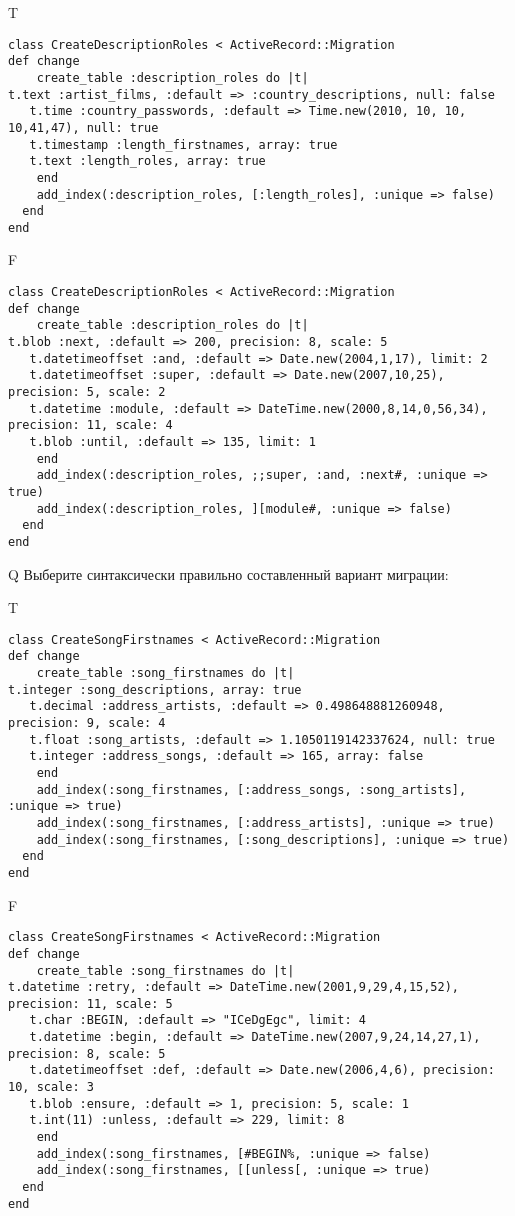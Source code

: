T
\begin{verbatim}
class CreateDescriptionRoles < ActiveRecord::Migration
def change
	create_table :description_roles do |t|
t.text :artist_films, :default => :country_descriptions, null: false
   t.time :country_passwords, :default => Time.new(2010, 10, 10, 10,41,47), null: true
   t.timestamp :length_firstnames, array: true
   t.text :length_roles, array: true
   	end
	add_index(:description_roles, [:length_roles], :unique => false)
  end 
end

\end{verbatim}

F
\begin{verbatim}
class CreateDescriptionRoles < ActiveRecord::Migration
def change
	create_table :description_roles do |t|
t.blob :next, :default => 200, precision: 8, scale: 5
   t.datetimeoffset :and, :default => Date.new(2004,1,17), limit: 2
   t.datetimeoffset :super, :default => Date.new(2007,10,25), precision: 5, scale: 2
   t.datetime :module, :default => DateTime.new(2000,8,14,0,56,34), precision: 11, scale: 4
   t.blob :until, :default => 135, limit: 1
   	end
	add_index(:description_roles, ;;super, :and, :next#, :unique => true)
 	add_index(:description_roles, ][module#, :unique => false)
  end 
end

\end{verbatim}

Q
Выберите синтаксически правильно составленный вариант миграции:

T
\begin{verbatim}
class CreateSongFirstnames < ActiveRecord::Migration
def change
	create_table :song_firstnames do |t|
t.integer :song_descriptions, array: true
   t.decimal :address_artists, :default => 0.498648881260948, precision: 9, scale: 4
   t.float :song_artists, :default => 1.1050119142337624, null: true
   t.integer :address_songs, :default => 165, array: false
   	end
	add_index(:song_firstnames, [:address_songs, :song_artists], :unique => true)
 	add_index(:song_firstnames, [:address_artists], :unique => true)
 	add_index(:song_firstnames, [:song_descriptions], :unique => true)
  end 
end

\end{verbatim}

F
\begin{verbatim}
class CreateSongFirstnames < ActiveRecord::Migration
def change
	create_table :song_firstnames do |t|
t.datetime :retry, :default => DateTime.new(2001,9,29,4,15,52), precision: 11, scale: 5
   t.char :BEGIN, :default => "ICeDgEgc", limit: 4
   t.datetime :begin, :default => DateTime.new(2007,9,24,14,27,1), precision: 8, scale: 5
   t.datetimeoffset :def, :default => Date.new(2006,4,6), precision: 10, scale: 3
   t.blob :ensure, :default => 1, precision: 5, scale: 1
   t.int(11) :unless, :default => 229, limit: 8
   	end
	add_index(:song_firstnames, [#BEGIN%, :unique => false)
 	add_index(:song_firstnames, [[unless[, :unique => true)
  end 
end

\end{verbatim}

